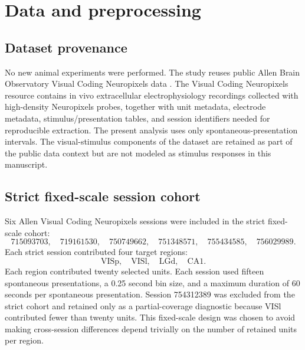 \documentclass[11pt]{article}
\begin{document}
\section{Data and preprocessing}

\subsection{Dataset provenance}

No new animal experiments were performed. The study reuses public Allen Brain Observatory Visual Coding Neuropixels data \citep{AllenBrainObservatoryVisualCodingNeuropixels}. The Visual Coding Neuropixels resource contains in vivo extracellular electrophysiology recordings collected with high-density Neuropixels probes, together with unit metadata, electrode metadata, stimulus/presentation tables, and session identifiers needed for reproducible extraction. The present analysis uses only spontaneous-presentation intervals. The visual-stimulus components of the dataset are retained as part of the public data context but are not modeled as stimulus responses in this manuscript.

\subsection{Strict fixed-scale session cohort}

Six Allen Visual Coding Neuropixels sessions were included in the strict fixed-scale cohort:
\[
715093703,\quad
719161530,\quad
750749662,\quad
751348571,\quad
755434585,\quad
756029989.
\]
Each strict session contributed four target regions:
\[
\mathrm{VISp},\quad \mathrm{VISl},\quad \mathrm{LGd},\quad \mathrm{CA1}.
\]
Each region contributed twenty selected units. Each session used fifteen spontaneous presentations, a 0.25 second bin size, and a maximum duration of 60 seconds per spontaneous presentation. Session 754312389 was excluded from the strict cohort and retained only as a partial-coverage diagnostic because VISl contributed fewer than twenty units. This fixed-scale design was chosen to avoid making cross-session differences depend trivially on the number of retained units per region.

\begin{table}[t]
\centering
\caption{Strict six-session extraction summary. Each strict session used four regions, twenty units per region, fifteen spontaneous presentations, and matched binning.}
\label{tab:strict-extraction}

\end{table}
\end{document}
